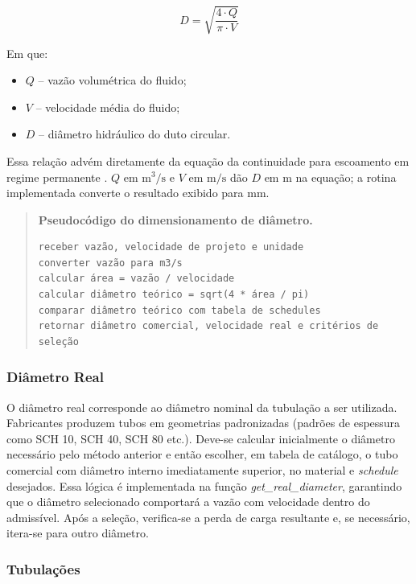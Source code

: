 \begin{equation}
D = \sqrt{\frac{4 \cdot Q}{\pi \cdot V}}
\label{eq:diametro_calc}
\end{equation}

Em que:
\begin{itemize}
    \item $Q$ -- vazão volumétrica do fluido;
    \item $V$ -- velocidade média do fluido;
    \item $D$ -- diâmetro hidráulico do duto circular.
\end{itemize}

Essa relação advém diretamente da equação da continuidade para escoamento em regime permanente \cite{white2018}. $Q$ em $\mathrm{m^3/s}$ e $V$ em $\mathrm{m/s}$ dão $D$ em $\mathrm{m}$ na equação; a rotina implementada converte o resultado exibido para $\mathrm{mm}$.

\begin{quote}
\small
\textbf{Pseudocódigo do dimensionamento de diâmetro.}
\begin{verbatim}
receber vazão, velocidade de projeto e unidade
converter vazão para m3/s
calcular área = vazão / velocidade
calcular diâmetro teórico = sqrt(4 * área / pi)
comparar diâmetro teórico com tabela de schedules
retornar diâmetro comercial, velocidade real e critérios de seleção
\end{verbatim}
\end{quote}
\subsubsection{Diâmetro Real}

O diâmetro real corresponde ao diâmetro nominal da tubulação a ser utilizada. Fabricantes produzem tubos em geometrias padronizadas (padrões de espessura como SCH 10, SCH 40, SCH 80 etc.). Deve-se calcular inicialmente o diâmetro necessário pelo método anterior e então escolher, em tabela de catálogo, o tubo comercial com diâmetro interno imediatamente superior, no material e \textit{schedule} desejados. Essa lógica é implementada na função \textit{get\_real\_diameter}, garantindo que o diâmetro selecionado comportará a vazão com velocidade dentro do admissível. Após a seleção, verifica-se a perda de carga resultante e, se necessário, itera-se para outro diâmetro.

\subsubsection{Tubulações}

